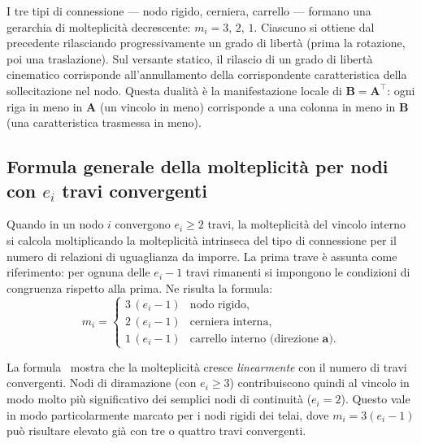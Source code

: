 \begin{oss}
	I tre tipi di connessione --- nodo rigido, cerniera,
	carrello --- formano una gerarchia di molteplicità
	decrescente: $m_i = 3,\, 2,\, 1$. Ciascuno si ottiene
	dal precedente rilasciando progressivamente un grado
	di libertà (prima la rotazione, poi una traslazione).
	Sul versante statico, il rilascio di un grado di libertà
	cinematico corrisponde all'annullamento della corrispondente
	caratteristica della sollecitazione nel nodo.
	Questa dualità è la manifestazione locale di
	$\bm{B} = \bm{A}^{\top}$: ogni riga in meno in $\bm{A}$
	(un vincolo in meno) corrisponde a una colonna in meno
	in $\bm{B}$ (una caratteristica trasmessa in meno).
\end{oss}


\subsection{Formula generale della molteplicità per nodi
	con $e_i$ travi convergenti}
\label{subsec:molt_generale}

Quando in un nodo $i$ convergono $e_i \geq 2$ travi,
la molteplicità del vincolo interno si calcola
moltiplicando la molteplicità intrinseca del tipo
di connessione per il numero di relazioni di uguaglianza
da imporre. La prima trave è assunta come riferimento:
per ognuna delle $e_i - 1$ travi rimanenti si impongono
le condizioni di congruenza rispetto alla prima.
Ne risulta la formula:
\begin{equation}\label{eq:molt_nodo}
	m_i =
	\begin{cases}
		3\,(e_i - 1) & \text{nodo rigido,} \\[4pt]
		2\,(e_i - 1) & \text{cerniera interna,} \\[4pt]
		1\,(e_i - 1) & \text{carrello interno (direzione } \bm{a}\text{).}
	\end{cases}
\end{equation}

\begin{oss}
	La formula~ mostra che la
	molteplicità cresce \emph{linearmente} con il numero
	di travi convergenti. Nodi di diramazione (con $e_i \geq 3$)
	contribuiscono quindi al vincolo in modo molto più
	significativo dei semplici nodi di continuità ($e_i = 2$).
	Questo vale in modo particolarmente marcato per i nodi
	rigidi dei telai, dove $m_i = 3(e_i - 1)$ può
	risultare elevato già con tre o quattro travi convergenti.
\end{oss}


